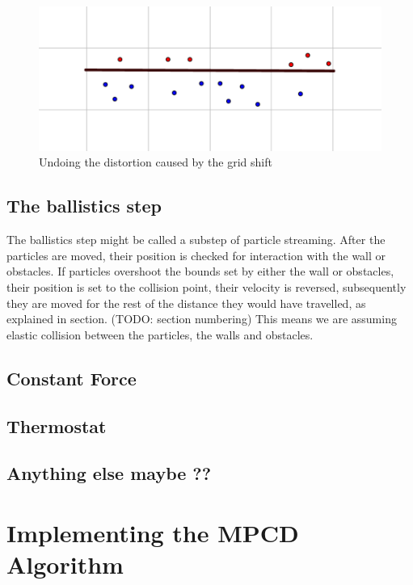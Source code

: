 \documentclass[
]{article}
\begin{document}
\begin{figure}
\centering
\includegraphics{Assets/Wall_stick_boundary_conditions_virtual_particles.png}
\caption{Undoing the distortion caused by the grid shift}
\end{figure}

\hypertarget{the-ballistics-step}{%
\subsection{The ballistics step}\label{the-ballistics-step}}

The ballistics step might be called a substep of particle streaming.
After the particles are moved, their position is checked for interaction
with the wall or obstacles. If particles overshoot the bounds set by
either the wall or obstacles, their position is set to the collision
point, their velocity is reversed, subsequently they are moved for the
rest of the distance they would have travelled, as explained in section.
(TODO: section numbering) This means we are assuming elastic collision
between the particles, the walls and obstacles.

\hypertarget{constant-force}{%
\subsection{Constant Force}\label{constant-force}}

\hypertarget{thermostat}{%
\subsection{Thermostat}\label{thermostat}}

\hypertarget{anything-else-maybe}{%
\subsection{Anything else maybe ??}\label{anything-else-maybe}}

\hypertarget{implementing-the-mpcd-algorithm}{%
\section{Implementing the MPCD
Algorithm}\label{implementing-the-mpcd-algorithm}}
\end{document}
